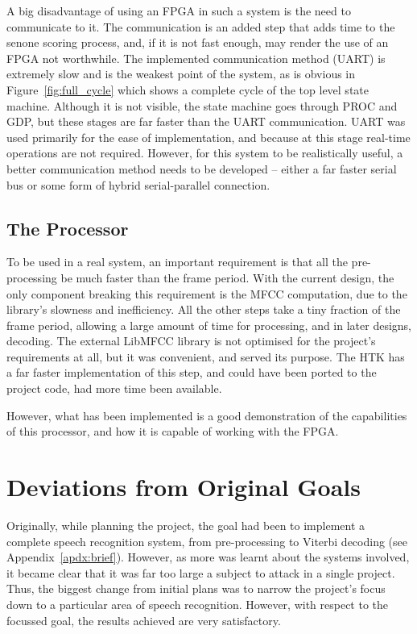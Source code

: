 		A big disadvantage of using an FPGA in such a system is the need to communicate to it.  The communication is an added step that adds time to the senone scoring process, and, if it is not fast enough, may render the use of an FPGA not worthwhile.  The implemented communication method (UART) is extremely slow and is the weakest point of the system, as is obvious in Figure~\ref{fig:full_cycle} which shows a complete cycle of the top level state machine.  Although it is not visible, the state machine goes through PROC and GDP, but these stages are far faster than the UART communication.  UART was used primarily for the ease of implementation, and because at this stage real-time operations are not required.  However, for this system to be realistically useful, a better communication method needs to be developed -- either a far faster serial bus or some form of hybrid serial-parallel connection.



	\subsection{The Processor} %
	\label{sub:analysis_the_processor}
		To be used in a real system, an important requirement is that all the pre-processing be much faster than the frame period.  With the current design, the only component breaking this requirement is the MFCC computation, due to the library's slowness and inefficiency.  All the other steps take a tiny fraction of the frame period, allowing a large amount of time for processing, and in later designs, decoding.  The external LibMFCC library is not optimised for the project's requirements at all, but it was convenient, and served its purpose.  The HTK has a far faster implementation of this step, and could have been ported to the project code, had more time been available.

		However, what has been implemented is a good demonstration of the capabilities of this processor, and how it is capable of working with the FPGA.


\section{Deviations from Original Goals} %
\label{sec:deviations_from_original_goals}
	Originally, while planning the project, the goal had been to implement a complete speech recognition system, from pre-processing to Viterbi decoding (see Appendix~\ref{apdx:brief}).  However, as more was learnt about the systems involved, it became clear that it was far too large a subject to attack in a single project.  Thus, the biggest change from initial plans was to narrow the project's focus down to a particular area of speech recognition.  However, with respect to the focussed goal, the results achieved are very satisfactory.

